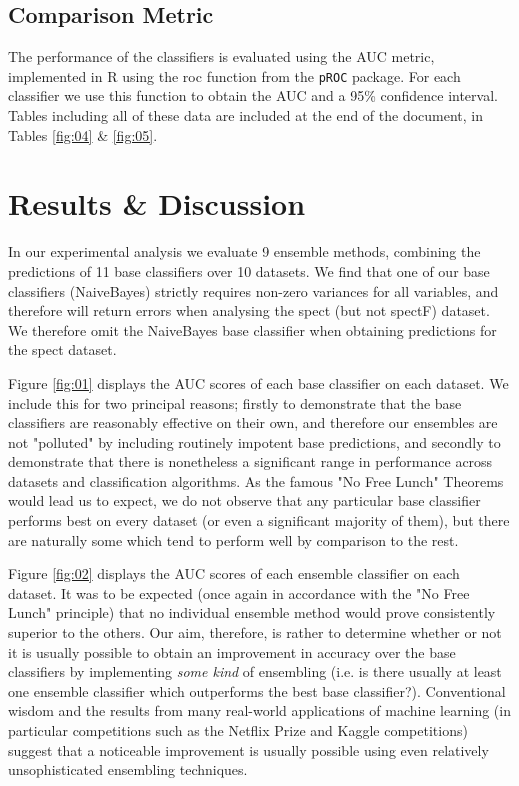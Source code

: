 \documentclass{document}
\begin{document}
\subsection{Comparison Metric}

The performance of the classifiers is evaluated using the AUC metric, implemented in R using the roc function from the \texttt{pROC} package. For each classifier we use this function to obtain the AUC and a 95\% confidence interval. Tables including all of these data are included at the end of the document, in Tables \ref{fig:04} \& \ref{fig:05}.



\section{Results \& Discussion}
\label{results&discussion}

In our experimental analysis we evaluate 9 ensemble methods, combining the predictions of 11 base classifiers over 10 datasets. We find that one of our base classifiers (NaiveBayes) strictly requires non-zero variances for all variables, and therefore will return errors when analysing the spect (but not spectF) dataset. We therefore omit the NaiveBayes base classifier when obtaining predictions for the spect dataset.

\noindent
Figure \ref{fig:01} displays the  AUC scores of each base classifier on each dataset. We include this for two principal reasons; firstly to demonstrate that the base classifiers are reasonably effective on their own, and therefore our ensembles are not "polluted" by including routinely impotent base predictions, and secondly to demonstrate that there is nonetheless a significant range in performance across datasets and classification algorithms. As the famous "No Free Lunch" Theorems would lead us to expect, we do not observe that any particular base classifier performs best on every dataset (or even a significant majority of them), but there are naturally some which tend to perform well by comparison to the rest.

\noindent
Figure \ref{fig:02} displays the  AUC scores of each ensemble classifier on each dataset. It was to be expected (once again in accordance with the "No Free Lunch" principle) that no individual ensemble method would prove consistently superior to the others. Our aim, therefore, is rather to determine whether or not it is usually possible to obtain an improvement in accuracy over the base classifiers by implementing \emph{some kind} of ensembling (i.e. is there usually at least one ensemble classifier which outperforms the best base classifier?). Conventional wisdom and the results from many real-world applications of machine learning (in particular competitions such as the Netflix Prize\cite{netflixprize} and Kaggle competitions\cite{kagglecompetitions}) suggest that a noticeable improvement is usually possible using even relatively unsophisticated ensembling techniques.
\end{document}
